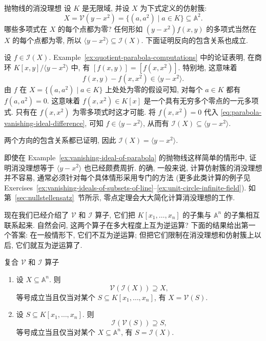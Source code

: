 \begin{Example}{抛物线的消没理想}\leavevmode\label{ex:vanishing-ideal-of-parabola}
  设 $K$ 是无限域, 并设 $X$ 为下式定义的仿射簇:
  \[
    X=\mathcal{V}(y-x^{2})=\{(a,a^{2})\mid a\in K\}\subseteq\mathbb{A}^{2}.
  \]
  哪些多项式在 $X$ 的每个点都为零? 任何形如 $(y-x^{2})f(x,y)$ 的多项式当然在 $X$ 的每个点都为零, 所以 $\langle y-x^{2}\rangle\subseteq\mathcal{I}(X)$. 下面证明反向的包含关系也成立.

  设 $f\in\mathcal{I}(X)$. Example~\ref{ex:quotient-parabola-computations} 中的论证表明, 在商环 $K[x,y]/\langle y-x^{2}\rangle$ 中, 有 $[f(x,y)]=[f(x,x^{2})]$. 特别地, 这意味着
  \begin{equation}\label{eq:parabola-vanishing-ideal-difference}
    f(x,y)-f(x,x^{2})\in\langle y-x^{2}\rangle.
  \end{equation}
  由 $f$ 在 $X=\{(a,a^{2})\mid a\in K\}$ 上处处为零的假设可知, 对每个 $a\in K$ 都有 $f(a,a^{2})=0$. 这意味着 $f(x,x^{2})\in K[x]$ 是一个具有无穷多个零点的一元多项式. 只有在 $f(x,x^{2})$ 为零多项式时这才可能. 将 $f(x,x^{2})=0$ 代入 \eqref{eq:parabola-vanishing-ideal-difference}, 可知 $f\in\langle y-x^{2}\rangle$, 从而有 $\mathcal{I}(X)\subseteq\langle y-x^{2}\rangle$.

  两个方向的包含关系都已证明, 因此 $\mathcal{I}(X)=\langle y-x^{2}\rangle$.
\end{Example}

即使在 Example~\ref{ex:vanishing-ideal-of-parabola} 的抛物线这样简单的情形中, 证明消没理想等于 $\langle y-x^{2}\rangle$ 也已经颇费周折. 的确, 一般来说, 计算仿射簇的消没理想并不容易, 通常必须针对每个具体情形采用专门的方法 (更多此类计算的例子见 Exercises~\ref{ex:vanishing-ideals-of-subsets-of-line}--\ref{ex:unit-circle-infinite-field}). 如第~\ref{sec:nullstellensatz}~节所示, 零点定理会大大简化计算消没理想的工作.

现在我们已经介绍了 $\mathcal{V}$ 和 $\mathcal{I}$ 算子, 它们把 $K[x_{1},\ldots,x_{n}]$ 的子集与 $\mathbb{A}^{n}$ 的子集相互联系起来. 自然会问, 这两个算子在多大程度上互为逆运算? 下面的结果给出第一个答案: 在一般情形下, 它们不互为逆运算; 但把它们限制在消没理想和仿射簇上以后, 它们就互为逆运算了.

\begin{Proposition}{复合 $\mathcal{V}$ 和 $\mathcal{I}$ 算子}\leavevmode\label{prop:compose-vanishing-operators}
  \strut\par\nopagebreak[4]
  \begin{enumerate}[label=\arabic*.,ref=\arabic*]
    \item\label{item:compose-vanishing-operators-sets} 设 $X\subseteq\mathbb{A}^{n}$. 则
    \[
      \mathcal{V}(\mathcal{I}(X))\supseteq X,
    \]
    等号成立当且仅当对某个 $S\subseteq K[x_{1},\ldots,x_{n}]$, 有 $X=\mathcal{V}(S)$.
    \item\label{item:compose-vanishing-operators-polynomials} 设 $S\subseteq K[x_{1},\ldots,x_{n}]$. 则
    \[
      \mathcal{I}(\mathcal{V}(S))\supseteq S,
    \]
    等号成立当且仅当对某个 $X\subseteq\mathbb{A}^{n}$, 有 $S=\mathcal{I}(X)$.
  \end{enumerate}
\end{Proposition}

